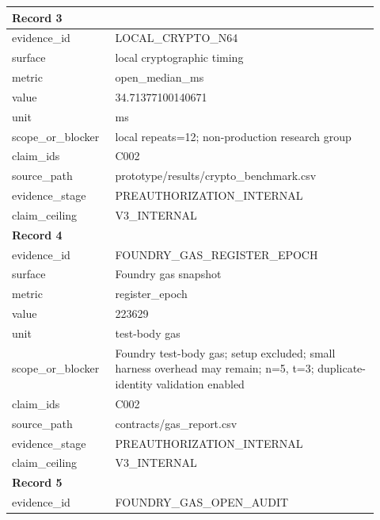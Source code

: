 \begin{longtable}{|p{0.24\linewidth}|p{0.68\linewidth}|}
\multicolumn{2}{|l|}{\textbf{Record 3}} \\ \hline
evidence\_\allowbreak{}id & LOCAL\_\allowbreak{}CRYPTO\_\allowbreak{}N64 \\ \hline
surface & local cryptographic timing \\ \hline
metric & open\_\allowbreak{}median\_\allowbreak{}ms \\ \hline
value & 34.71377100140671 \\ \hline
unit & ms \\ \hline
scope\_\allowbreak{}or\_\allowbreak{}blocker & local repeats=12;\allowbreak{} non-production research group \\ \hline
claim\_\allowbreak{}ids & C002 \\ \hline
source\_\allowbreak{}path & prototype/results/crypto\_\allowbreak{}benchmark.csv \\ \hline
evidence\_\allowbreak{}stage & PREAUTHORIZATION\_\allowbreak{}INTERNAL \\ \hline
claim\_\allowbreak{}ceiling & V3\_\allowbreak{}INTERNAL \\ \hline
\multicolumn{2}{|l|}{\textbf{Record 4}} \\ \hline
evidence\_\allowbreak{}id & FOUNDRY\_\allowbreak{}GAS\_\allowbreak{}REGISTER\_\allowbreak{}EPOCH \\ \hline
surface & Foundry gas snapshot \\ \hline
metric & register\_\allowbreak{}epoch \\ \hline
value & 223629 \\ \hline
unit & test-body gas \\ \hline
scope\_\allowbreak{}or\_\allowbreak{}blocker & Foundry test-body gas;\allowbreak{} setup excluded;\allowbreak{} small harness overhead may remain;\allowbreak{} n=5, t=3;\allowbreak{} duplicate-identity validation enabled \\ \hline
claim\_\allowbreak{}ids & C002 \\ \hline
source\_\allowbreak{}path & contracts/gas\_\allowbreak{}report.csv \\ \hline
evidence\_\allowbreak{}stage & PREAUTHORIZATION\_\allowbreak{}INTERNAL \\ \hline
claim\_\allowbreak{}ceiling & V3\_\allowbreak{}INTERNAL \\ \hline
\multicolumn{2}{|l|}{\textbf{Record 5}} \\ \hline
evidence\_\allowbreak{}id & FOUNDRY\_\allowbreak{}GAS\_\allowbreak{}OPEN\_\allowbreak{}AUDIT \\ \hline

\end{longtable}
